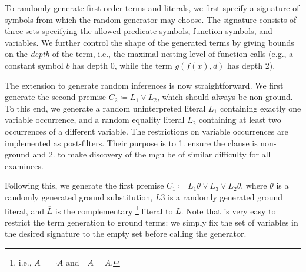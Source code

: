 To randomly generate first-order terms and literals,
we first specify a signature of symbols from which the random generator may choose.
The signature consists of three sets specifying the allowed
predicate symbols, %
function symbols, %
and variables.
We further control the shape of the generated terms
by giving bounds on the \emph{depth} of the term,
i.e., the maximal nesting level of function calls
(e.g., a constant symbol $b$ has depth 0, while the term $g(f(x),d)$ has depth 2).


The extension to generate random inferences is now straightforward.
We first generate the second premise $C_2 \coloneqq L_1 \lor L_2$, which should always be non-ground.
To this end, we generate a random uninterpreted literal $L_1$ containing exactly one variable occurrence,
and a random equality literal $L_2$ containing at least two occurrences of a different variable.
The restrictions on variable occurrences are implemented as post-filters.
Their purpose is to 1. ensure the clause is non-ground
and 2. to make discovery of the mgu be of similar difficulty for all examinees.


Following this, we generate the first premise $C_1 \coloneqq \overline{L_1\theta} \lor L_3 \lor L_2\theta$,
where $\theta$ is a randomly generated ground substitution,
$L3$ is a randomly generated ground literal,
and
$\overline{L}$ is the complementary%
\footnote{i.e., $\overline{A} = \lnot A$ and $\overline{\lnot A} = A$.}
literal to $L$.
Note that is very easy to restrict the term generation to ground terms:
we simply fix the set of variables in the desired signature to the empty set before calling the generator.


